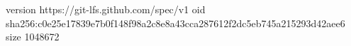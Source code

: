 version https://git-lfs.github.com/spec/v1
oid sha256:c0e25e17839e7b0f148f98a2c8e8a43cca287612f2dc5eb745a215293d42aee6
size 1048672
